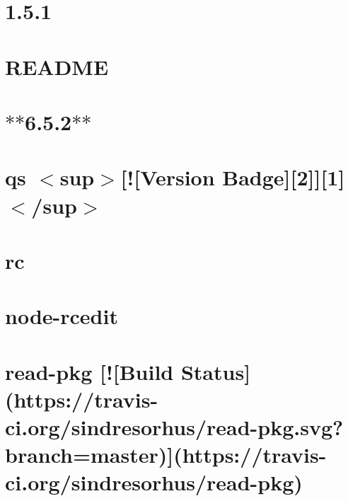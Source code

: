 \documentclass[twoside]{book}
\newcommand{\+}{\discretionary{\mbox{\scriptsize$\hookleftarrow$}}{}{}}
\begin{document}
\chapter{1.5.1}
\label{md_dsmacc_vis_degree_node_modules_q_CHANGES}

\chapter{R\+E\+A\+D\+ME}
\label{md_dsmacc_vis_degree_node_modules_q_README}

\chapter{$\ast$$\ast$6.5.2$\ast$$\ast$}
\label{md_dsmacc_vis_degree_node_modules_qs_CHANGELOG}

\chapter{qs $<$sup$>$\mbox{[}!\mbox{[}Version Badge\mbox{]}\mbox{[}2\mbox{]}\mbox{]}\mbox{[}1\mbox{]}$<$/sup$>$}
\label{md_dsmacc_vis_degree_node_modules_qs_README}

\chapter{rc}
\label{md_dsmacc_vis_degree_node_modules_rc_README}

\chapter{node-\/rcedit}
\label{md_dsmacc_vis_degree_node_modules_rcedit_README}

\chapter{read-\/pkg \mbox{[}!\mbox{[}Build Status\mbox{]}(https\+://travis-\/ci.org/sindresorhus/read-\/pkg.svg?branch=master)\mbox{]}(https\+://travis-\/ci.org/sindresorhus/read-\/pkg)}
\label{md_dsmacc_vis_degree_node_modules_read-pkg_readme}

\end{document}
